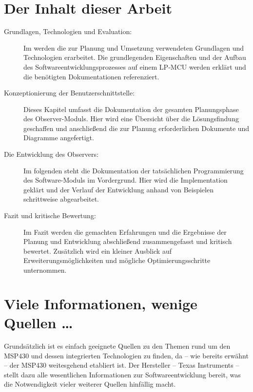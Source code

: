 \newpage
\section{Der Inhalt dieser Arbeit}
\label{sec:AufbauDieserArbeit}

\begin{description}

	\item[Grundlagen, Technologien und Evaluation:] Im  werden die zur Planung und Umsetzung verwendeten Grundlagen und Technologien erarbeitet. Die grundlegenden Eigenschaften und der Aufbau des Softwareentwicklungsprozesses auf einem LP-MCU werden erkl\"art und die ben\"otigten Dokumentationen referenziert.
	
	\item[Konzeptionierung der Benutzerschnittstelle:] Dieses Kapitel umfasst die Dokumentation der gesamten Planungsphase des Observer-Moduls. Hier wird eine \"Ubersicht \"uber die L\"osungsfindung geschaffen und anschlie{\ss}end die zur Planung erforderlichen Dokumente und Diagramme angefertigt.
	
	\item[Die Entwicklung des Observers:] Im folgenden steht die Dokumentation der tats\"achlichen Programmierung des Software-Moduls im Vordergrund. Hier wird die Implementation gekl\"art und der Verlauf der Entwicklung anhand von Beispielen schrittweise abgearbeitet.
	
	\item[Fazit und kritische Bewertung:] Im Fazit werden die gemachten Erfahrungen und die Ergebnisse der Planung und Entwicklung abschlie{\ss}end zusammengefasst und kritisch bewertet. Zus\"atzlich wird ein kleiner Ausblick auf Erweiterungsm\"oglichkeiten und m\"ogliche Optimierungsschritte unternommen.

\end{description}

\section{Viele Informationen, wenige Quellen \dots}
\label{sec:Quellenlage}

Grunds\"atzlich ist es einfach geeignete Quellen zu den Themen rund um den MSP430 und dessen integrierten Technologien zu finden, da -- wie bereits erw\"ahnt -- der MSP430 weitesgehend etabliert ist. Der Hersteller -- Texas Instruments -- stellt dazu alle wesentlichen Informationen zur Softwareentwicklung bereit, was die Notwendigkeit vieler weiterer Quellen hinf\"allig macht.